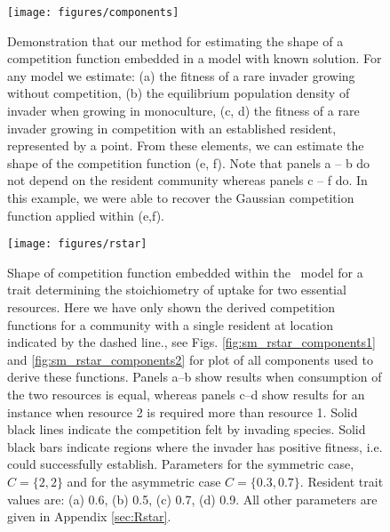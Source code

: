 \documentclass[a4paper,11pt]{article}
\newcommand{\todo}[1]{{\color{navy}{(todo: #1)}}}
\begin{document}
{\begin{figure}[h]
 \centering
 \texttt{[image: figures/components]}
 \caption{Demonstration that our method for estimating the shape of a competition function embedded in a model with known solution. For any model we estimate: (a) the fitness of a rare invader growing without competition, (b) the equilibrium population density of invader when growing in monoculture, (c, d) the fitness of a rare invader growing in competition with an established resident, represented by a point. From these elements, we can estimate the shape of the competition function (e, f). Note that panels a -- b do not depend on the resident community whereas panels c -- f do. In this example, we were able to recover the Gaussian competition function applied within \citet{Dieckmann-1999} (e,f).
 \todo{1. Above panels c-d, add some space and labels "At attractor" and "Away from attractor", as in Fig. 3.
 2. Remove blacks bars from figure (and also those in SuppMat) showing regions of positive fitness in panels e-f. these are not needed, as the same info is in the middle panels.
 3. Change x-axis label to same as Fig 3 (trait vale) }}
  \label{fig:components}
\end{figure}

\clearpage

\begin{figure}[h]
  \centering
  \texttt{[image: figures/rstar]}
  \caption{Shape of competition function embedded within the \Rstar\ model for a trait determining the stoichiometry of uptake for two essential resources. Here we have only shown the derived  competition functions for a community with a single resident at location indicated by the dashed line., see Figs. \ref{fig:sm_rstar_components1} and \ref{fig:sm_rstar_components2} for plot of all components used to derive these functions. Panels a--b show results when consumption of the two resources is equal, whereas panels c--d show results for an instance when resource 2 is required more than resource 1. Solid black lines indicate the competition felt by invading species. Solid black bars indicate regions where the invader has positive fitness, i.e. could successfully establish. Parameters for the symmetric case, $C = \{2, 2\}$ and for the asymmetric case $C = \{0.3, 0.7\}$. Resident trait values are: (a) 0.6, (b) 0.5, (c) 0.7, (d) 0.9. All other parameters are given in Appendix \ref{sec:Rstar}.} 
  \label{fig:Rstar}
\end{figure}

\clearpage

}
\end{document}
